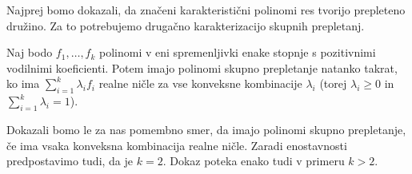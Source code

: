 Najprej bomo dokazali, da značeni karakteristični polinomi res tvorijo prepleteno družino. Za to potrebujemo drugačno karakterizacijo skupnih prepletanj\cite{DEDIEU1992269}.
\begin{izrek}\label{konveksne-kombinacije-prepletenih}
    Naj bodo \(f_1, \ldots, f_k\) polinomi v eni spremenljivki enake stopnje s pozitivnimi vodilnimi koeficienti. Potem imajo polinomi skupno prepletanje natanko takrat, ko ima \(\sum_{i=1}^k \lambda_i f_i\) realne ničle za vse konveksne kombinacije \(\lambda_i\) (torej \(\lambda_i\geq 0\) in \(\sum_{i=1}^k \lambda_i=1\)).
\end{izrek}
Dokazali bomo le za nas pomembno smer, da imajo polinomi skupno prepletanje, če ima vsaka konveksna kombinacija realne ničle. Zaradi enostavnosti predpostavimo tudi, da je \(k=2\). Dokaz poteka enako tudi v primeru \(k>2\).
